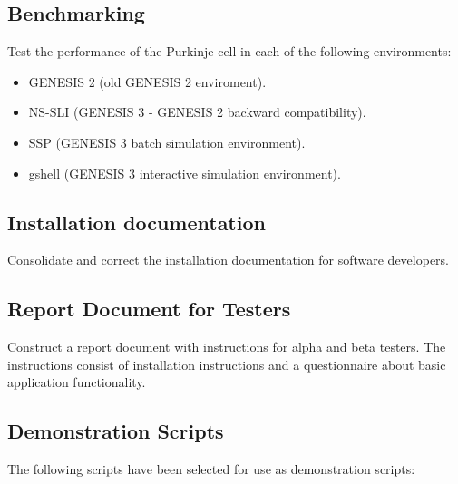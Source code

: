 \documentclass[12pt]{article}
\begin{document}
\subsection{Benchmarking}

Test the performance of the Purkinje cell in each of the following
environments:

\begin{itemize}
\item GENESIS 2 (old GENESIS 2 enviroment).
\item NS-SLI (GENESIS 3 - GENESIS 2 backward compatibility).
\item SSP (GENESIS 3 batch simulation environment).
\item gshell (GENESIS 3 interactive simulation environment).
\end{itemize}


\subsection{Installation documentation}

Consolidate and correct the installation documentation for software
developers.


\subsection{Report Document for Testers}

Construct a report document with instructions for alpha and beta
testers.  The instructions consist of installation instructions and a
questionnaire about basic application functionality.


\subsection{Demonstration Scripts}

The following scripts have been selected for use as demonstration
scripts:
\end{document}
